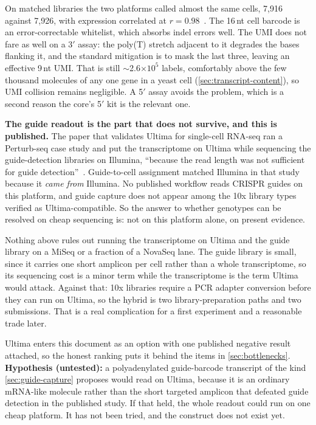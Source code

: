  On matched libraries the two
platforms called almost the same cells, 7{,}916 against 7{,}926, with expression
correlated at $r=0.98$~\citep{simmonsMostlyNaturalSequencing2023}. The 16\,nt
cell barcode is an error-correctable whitelist, which absorbs indel errors well.
The UMI does not fare as well on a 3$'$ assay: the poly(T) stretch adjacent to it
degrades the bases flanking it, and the standard mitigation is to mask the last
three, leaving an effective 9\,nt UMI. That is still $\sim$2.6$\times10^{5}$
labels, comfortably above the few thousand molecules of any one gene in a yeast
cell (\cref{sec:transcript-content}), so UMI collision remains negligible. A
5$'$ assay avoids the problem, which is a second reason the core's 5$'$ kit is
the relevant one.

\begin{keybox}
\textbf{The guide readout is the part that does not survive, and this is
published.} The paper that validates Ultima for single-cell RNA-seq ran a
Perturb-seq case study and put the transcriptome on Ultima while sequencing the
guide-detection libraries on Illumina, ``because the read length was not
sufficient for guide
detection''~\citep{simmonsMostlyNaturalSequencing2023}. Guide-to-cell assignment
matched Illumina in that study because it \emph{came from} Illumina. No published
workflow reads CRISPR guides on this platform, and guide capture does not appear
among the 10x library types verified as Ultima-compatible. So the answer to
whether genotypes can be resolved on cheap sequencing is: not on this platform
alone, on present evidence.
\end{keybox}

 Nothing above rules out
running the transcriptome on Ultima and the guide library on a MiSeq or a
fraction of a NovaSeq lane. The guide library is small, since it carries one
short amplicon per cell rather than a whole transcriptome, so its sequencing cost
is a minor term while the transcriptome is the term Ultima would attack. Against
that: 10x libraries require a PCR adapter conversion before they can run on
Ultima, so the hybrid is two library-preparation paths and two submissions. That
is a real complication for a first experiment and a reasonable trade later.

 Ultima enters this document as an option
with one published negative result attached, so the honest ranking puts it behind
the items in \cref{sec:bottlenecks}. \textbf{Hypothesis (untested):} a
polyadenylated guide-barcode transcript of the kind \cref{sec:guide-capture}
proposes would read on Ultima, because it is an ordinary mRNA-like molecule
rather than the short targeted amplicon that defeated guide detection in the
published study. If that held, the whole readout could run on one cheap platform.
It has not been tried, and the construct does not exist yet.
